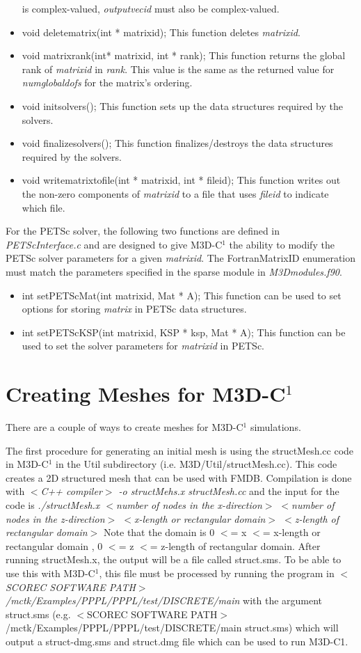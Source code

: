 \begin{itemize}
is complex-valued, \textit{outputvecid} must also be complex-valued.
\item  void deletematrix(int * matrixid);  This function deletes \textit{matrixid}.
\item  void matrixrank(int* matrixid, int * rank);  This function returns the global rank of \textit{matrixid}
in \textit{rank}.  This value is the same as the returned value for \textit{numglobaldofs} for the matrix's
ordering.
\item  void initsolvers();  This function sets up the data structures required by the solvers.
\item  void finalizesolvers();  This function finalizes/destroys the data structures required by the solvers.
\item  void writematrixtofile(int * matrixid, int * fileid);  This function writes out the non-zero components
of \textit{matrixid} to a file that uses \textit{fileid} to indicate which file.
\end{itemize}
For the PETSc solver, the following two functions are defined in \textit{PETScInterface.c} and are designed
to give M3D-C$^1$ the ability to modify the PETSc solver parameters for a given \textit{matrixid}.  
The FortranMatrixID enumeration must match the parameters specified in the sparse module in \textit{M3Dmodules.f90}.
\begin{itemize}
\item  int setPETScMat(int matrixid, Mat * A);  This function can be used to set options for storing \textit{matrix}
in PETSc data structures.
\item int setPETScKSP(int matrixid, KSP * ksp, Mat * A); This function can be used to set the solver
parameters for \textit{matrixid} in PETSc.
\end{itemize}

\chapter{Creating Meshes for M3D-C$^1$}
There are a couple of ways to create meshes for M3D-C$^1$ simulations.  

The first procedure for generating an initial mesh is using the 
structMesh.cc code in 
M3D-C$^1$ in the Util subdirectory (i.e. M3D/Util/structMesh.cc).  This code
 creates a 2D structured mesh that can be used with FMDB.  Compilation is done with
 \textit{$<$C++ compiler$>$ -o structMehs.x structMesh.cc} and the input for the code is
\textit{./structMesh.x $<$number of nodes in the x-direction$>$ $<$number of nodes in the z-direction$>$ 
$<$x-length or rectangular domain$>$ $<$z-length of rectangular domain$>$}
Note that the domain is 0 $<$= x $<$= x-length or rectangular domain , 0 $<$= z $<$= z-length of rectangular domain.
After running structMesh.x, the output will be a file called struct.sms.  To be
able to use this with M3D-C$^1$, this file must be processed by running the program
in \textit{$<$SCOREC SOFTWARE PATH$>$/mctk/Examples/PPPL/PPPL/test/DISCRETE/main} with the argument struct.sms 
(e.g. $<$SCOREC SOFTWARE PATH$>$/mctk/Examples/PPPL/PPPL/test/DISCRETE/main struct.sms)
which will output a struct-dmg.sms and struct.dmg file which can be used to
run M3D-C1.

